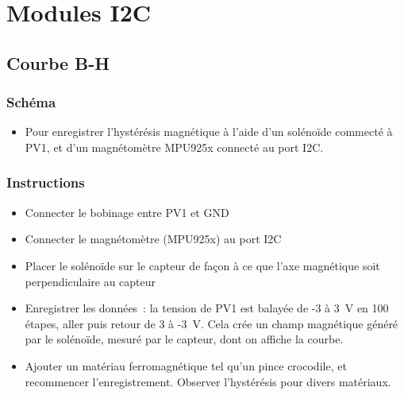 \documentclass[a4paper,12pt,french]{sphinxmanual}
\begin{document}


\chapter{Modules I2C}
\label{\detokenize{index:modules-i2c}}

\section{Courbe B-H}
\label{\detokenize{8.1:courbe-b-h}}\label{\detokenize{8.1::doc}}

\subsection{Schéma}
\label{\detokenize{8.1:schema}}\begin{itemize}
\item {} 
Pour enregistrer l’hystérésis magnétique à l’aide d’un solénoïde commecté à PV1, et d’un magnétomètre MPU925x connecté au port I2C.

\end{itemize}


\subsection{Instructions}
\label{\detokenize{8.1:instructions}}\begin{itemize}
\item {} 
Connecter le bobinage entre PV1 et GND

\item {} 
Connecter le magnétomètre (MPU925x) au port I2C

\item {} 
Placer le solénoïde sur le capteur de façon à ce que l’axe magnétique soit perpendiculaire au capteur

\item {} 
Enregistrer les données : la tension de PV1 est balayée de -3 à 3 V en 100 étapes, aller puis retour de 3 à -3 V. Cela crée un champ magnétique généré par le solénoïde, mesuré par le capteur, dont on affiche la courbe.

\item {} 
Ajouter un matériau ferromagnétique tel qu’un pince crocodile, et recommencer l’enregistrement. Observer l’hystérésis pour divers matériaux.

\end{itemize}
\end{document}
